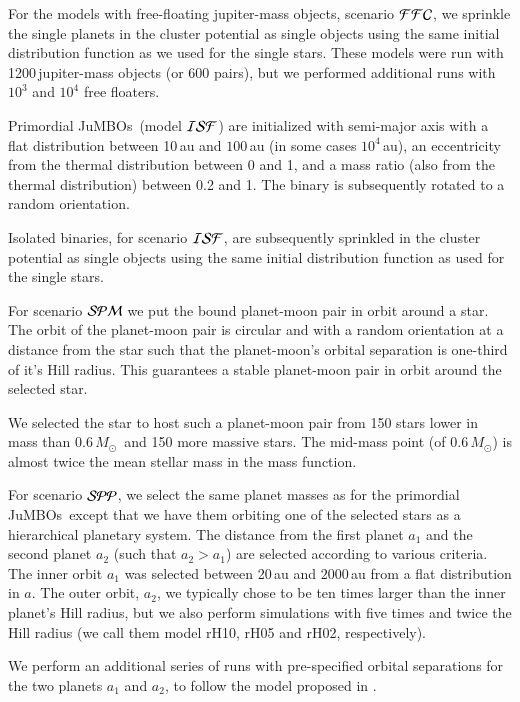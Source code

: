 \documentclass[aa]{lib/aa}
\newcommand{\MSun}{\mbox{${M}_\odot$}}
\newcommand{\jumbos}{\mbox{JuMBOs}}
\begin{document}
For the models with free-floating jupiter-mass objects, scenario
${\cal FFC}$, we sprinkle the single planets in the cluster potential
as single objects using the same initial distribution function as we
used for the single stars.  These models were run with
1200\,jupiter-mass objects (or 600 pairs), but we performed additional
runs with $10^3$ and $10^4$ free floaters.

Primordial \jumbos\, (model ${\cal ISF}$) are initialized with
semi-major axis with a flat distribution between 10\,au and $100$\,au
(in some cases $10^4$\,au), an eccentricity from the thermal
distribution between 0 and 1, and a mass ratio (also from the thermal
distribution) between 0.2 and 1.  The binary is subsequently rotated
to a random orientation. 

Isolated binaries, for scenario ${\cal ISF}$, are subsequently
sprinkled in the cluster potential as single objects using the same
initial distribution function as used for the single stars.

For scenario ${\cal SPM}$ we put the bound planet-moon pair in orbit
around a star.  The orbit of the planet-moon pair is circular and with
a random orientation at a distance from the star such that the
planet-moon's orbital separation is one-third of it's Hill radius.
This guarantees a stable planet-moon pair in orbit around the selected
star.

We selected the star to host such a planet-moon pair from 150 stars
lower in mass than 0.6\,\MSun\, and 150 more massive stars. The
mid-mass point (of 0.6\,\MSun) is almost twice the mean stellar mass
in the mass function.

For scenario ${\cal SPP}$, we select the same planet masses as for the
primordial \jumbos\, except that we have them orbiting one of the
selected stars as a hierarchical planetary system. The distance from
the first planet $a_1$ and the second planet $a_2$ (such that
$a_2>a_1$) are selected according to various criteria.  The inner
orbit $a_1$ was selected between 20\,au and $2000$\,au from a flat
distribution in $a$.  The outer orbit, $a_2$, we typically chose to be
ten times larger than the inner planet's Hill radius, but we also
perform simulations with five times and twice the Hill radius (we call
them model rH10, rH05 and rH02, respectively).

We perform an additional series of runs with pre-specified orbital
separations for the two planets $a_1$ and $a_2$, to follow the model
proposed in \cite{2023arXiv231006016W}.
\end{document}
